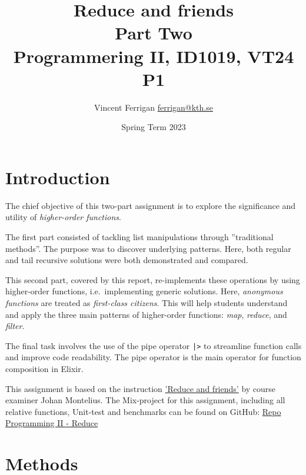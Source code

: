 \documentclass[a4paper,11pt]{article}
\begin{document}
\title{
    Reduce and friends
    \\Part Two
\\\small{Programmering II, ID1019, VT24 P1}
}
\author{Vincent Ferrigan \href{mailto:ferrigan@kth.se}{ferrigan@kth.se}}

\date{Spring Term 2023}

\maketitle

\section*{Introduction}
\label{sec:introduction}
The chief objective of this two-part assignment is to explore the significance and utility
of \emph{higher-order functions}.

The first part consisted of tackling list manipulations through
''traditional methods''.
The purpose was to discover underlying patterns.
Here, both regular and tail recursive solutions were both
demonstrated and compared.

This second part, covered by this report, re-implements these operations by using
higher-order functions, i.e.\ implementing generic solutions.
Here, \emph{anonymous functions} are treated as \emph{first-class citizens}.
This will help students understand and apply the three main patterns of
higher-order functions: \emph{map}, \emph{reduce}, and \emph{filter}.

The final task involves the use of the pipe operator
\texttt{|>}
to streamline
function calls and improve code readability.
The pipe operator is the main operator for function composition in Elixir.

This assignment is based on the instruction
\href{https://people.kth.se/~johanmon/courses/id1019/seminars/reduce/reduce.pdf}{'Reduce and friends'}
by course examiner Johan Montelius.
The Mix-project for this assignment, including all relative functions, Unit-test and benchmarks can be found on GitHub:
\href{https://github.com/VincentFerrigan/kth-id1019-programming-ii/tree/main/tasks/4/reduce}{Repo Programming II - Reduce}%

\section*{Methods}
\label{sec:methods}
\end{document}
